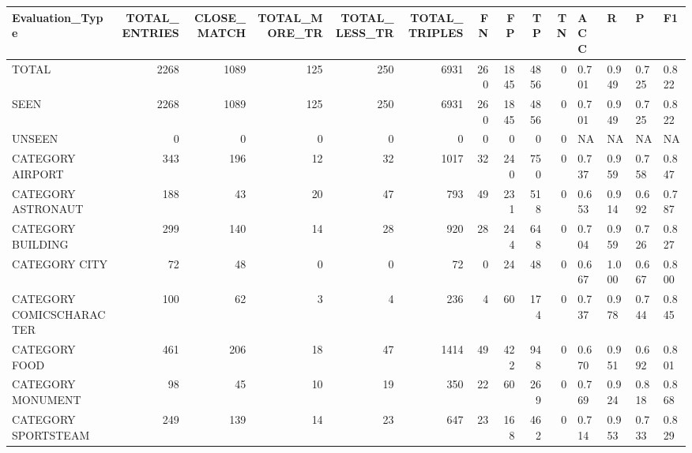 \begin{tabular}{lrrrrrrrrrllll}
\hline
 Evaluation\_Type          &   TOTAL\_ENTRIES &   CLOSE\_MATCH &   TOTAL\_MORE\_TR &   TOTAL\_LESS\_TR &   TOTAL\_TRIPLES &   FN &   FP &   TP &   TN & ACC   & R     & P     & F1    \\
\hline
 TOTAL                    &            2268 &          1089 &             125 &             250 &            6931 &  260 & 1845 & 4856 &    0 & 0.701 & 0.949 & 0.725 & 0.822 \\
 SEEN                     &            2268 &          1089 &             125 &             250 &            6931 &  260 & 1845 & 4856 &    0 & 0.701 & 0.949 & 0.725 & 0.822 \\
 UNSEEN                   &               0 &             0 &               0 &               0 &               0 &    0 &    0 &    0 &    0 & NA    & NA    & NA    & NA    \\
 CATEGORY AIRPORT         &             343 &           196 &              12 &              32 &            1017 &   32 &  240 &  750 &    0 & 0.737 & 0.959 & 0.758 & 0.847 \\
 CATEGORY ASTRONAUT       &             188 &            43 &              20 &              47 &             793 &   49 &  231 &  518 &    0 & 0.653 & 0.914 & 0.692 & 0.787 \\
 CATEGORY BUILDING        &             299 &           140 &              14 &              28 &             920 &   28 &  244 &  648 &    0 & 0.704 & 0.959 & 0.726 & 0.827 \\
 CATEGORY CITY            &              72 &            48 &               0 &               0 &              72 &    0 &   24 &   48 &    0 & 0.667 & 1.000 & 0.667 & 0.800 \\
 CATEGORY COMICSCHARACTER &             100 &            62 &               3 &               4 &             236 &    4 &   60 &  174 &    0 & 0.737 & 0.978 & 0.744 & 0.845 \\
 CATEGORY FOOD            &             461 &           206 &              18 &              47 &            1414 &   49 &  422 &  948 &    0 & 0.670 & 0.951 & 0.692 & 0.801 \\
 CATEGORY MONUMENT        &              98 &            45 &              10 &              19 &             350 &   22 &   60 &  269 &    0 & 0.769 & 0.924 & 0.818 & 0.868 \\
 CATEGORY SPORTSTEAM      &             249 &           139 &              14 &              23 &             647 &   23 &  168 &  462 &    0 & 0.714 & 0.953 & 0.733 & 0.829 \\

\end{tabular}
